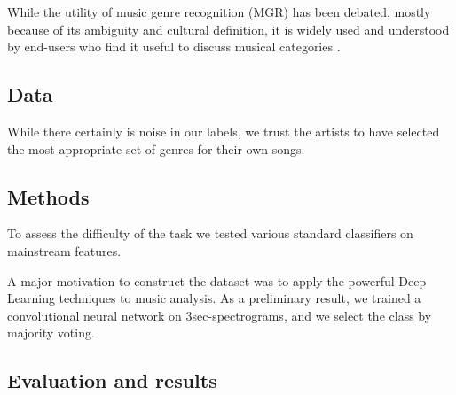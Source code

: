 \documentclass{article}
\begin{document}

While the utility of music genre recognition (MGR) has been debated, mostly because of its ambiguity and cultural definition, it is widely used and understood by end-users who find it useful to discuss musical categories \cite{mgr_why}.

\subsection{Data}

While there certainly is noise in our labels, we trust the artists to have selected the most appropriate set of genres for their own songs.


\subsection{Methods}

To assess the difficulty of the task we tested various standard classifiers on mainstream features.

A major motivation to construct the dataset was to apply the powerful Deep Learning techniques to music analysis. As a preliminary result, we trained a convolutional neural network on 3sec-spectrograms, and we select the class by majority voting.


\subsection{Evaluation and results}
\end{document}

